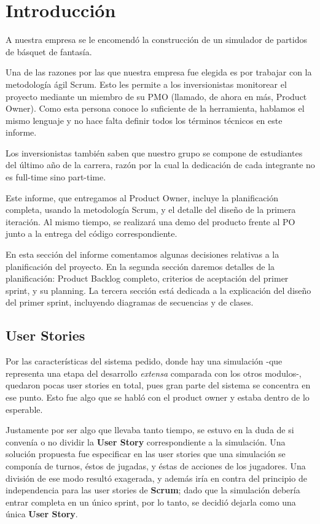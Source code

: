\section{Introducción}
\indent \indent A nuestra empresa se le encomendó la construcción de un simulador de partidos de básquet de fantasía.

Una de las razones por las que nuestra empresa fue elegida es por trabajar con la metodología ágil Scrum. Esto les permite a los inversionistas monitorear el proyecto mediante un miembro de su PMO (llamado, de ahora en más, Product Owner). Como esta persona conoce lo suficiente de la herramienta, hablamos el mismo lenguaje y no hace falta definir todos los términos técnicos en este informe.

Los inversionistas también saben que nuestro grupo se compone de estudiantes del último año de la carrera, razón por la cual la dedicación de cada integrante no es full-time sino part-time.

Este informe, que entregamos al Product Owner, incluye la planificación completa, usando la metodología Scrum, y el detalle del diseño de la primera iteración. Al mismo tiempo, se realizará una demo del producto frente al PO junto a la entrega del código correspondiente.

En esta sección del informe comentamos algunas decisiones relativas a la planificación del proyecto. En la segunda sección daremos detalles de la planificación: Product Backlog completo, criterios de aceptación del primer sprint, y su planning. La tercera sección está dedicada a la explicación del diseño del primer sprint, incluyendo diagramas de secuencias y de clases.

\subsection*{User Stories}
Por las características del sistema pedido, donde hay una simulación -que representa una etapa del desarrollo \emph{extensa} comparada con los otros modulos-, quedaron pocas user stories en total, pues gran parte del sistema se concentra en ese punto. Esto fue algo que se habló con el product owner y estaba dentro de lo esperable.

Justamente por ser algo que llevaba tanto tiempo, se estuvo en la duda de si convenía o no dividir la \textbf{User Story} correspondiente a la simulación. Una solución propuesta fue especificar en las user stories que una simulación se componía de turnos, éstos de jugadas, y éstas de acciones de los jugadores. Una división de ese modo resultó exagerada, y además iría en contra del principio de independencia para las user stories de \textbf{Scrum}; dado que la simulación debería entrar completa en un único sprint, por lo tanto, se decidió dejarla como una única \textbf{User Story}.

